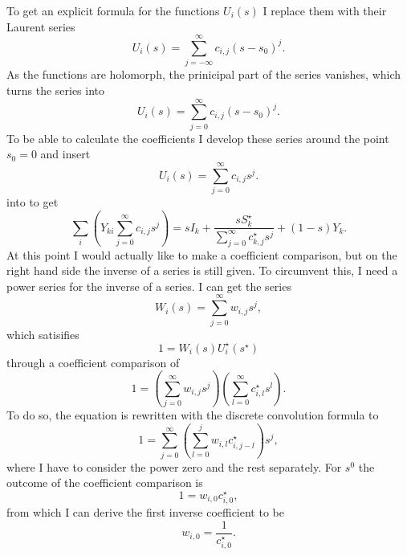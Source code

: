 To get an explicit formula for the functions $U_i(s)$ I replace them with their Laurent series
\begin{equation}
	U_i(s) = \sum_{j = -\infty}^\infty c_{i,j} (s - s_0)^j.
\end{equation}
As the functions are holomorph, the prinicipal part of the series vanishes, which turns the series into
\begin{equation}
	U_i(s) = \sum_{j = 0}^\infty c_{i,j} (s - s_0)^j.
\end{equation}
To be able to calculate the coefficients I develop these series around the point $s_0 = 0$ and insert
\begin{equation}
	U_i(s) = \sum_{j = 0}^\infty c_{i,j} s^j.
	\label{eq:helm_series}
\end{equation}
into  to get
\begin{equation}
		\sum_i \left( Y_{ki} \sum_{j = 0}^\infty c_{i,j} s^j \right) = s I_k + \frac{s S_k^\star}{\sum_{j = 0}^\infty c_{k,j}^\star s^j} + (1 - s) Y_k.
		\label{eq:helm_series_pq_bus}
\end{equation}
At this point I would actually like to make a coefficient comparison, but on the right hand side the inverse of a series is still given. To circumvent this, I need a power series for the inverse of a series. I can get the series
\begin{equation}
	W_i(s) = \sum_{j = 0}^\infty w_{i,j} s^j,
\end{equation}
which satisifies
\begin{equation}
	1 = W_i(s) U_i^\star(s^\star)
\end{equation}
through a coefficient comparison of
\begin{equation}
	1 = \left( \sum_{j = 0}^\infty w_{i,j} s^j \right) \left( \sum_{l = 0}^\infty c_{i,l}^\star s^l \right).
\end{equation}
To do so, the equation is rewritten with the discrete convolution formula to
\begin{equation}
	1 = \sum_{j = 0}^\infty \left( \sum_{l = 0}^j w_{i,l} c_{i,j - l}^\star \right) s^j,
\end{equation}
where I have to consider the power zero and the rest separately. For $s^0$ the outcome of the coefficient comparison is
\begin{equation}
	1 = w_{i,0} c_{i,0}^\star,
\end{equation}
from which I can derive the first inverse coefficient to be
\begin{equation}
	w_{i,0} = \frac{1}{c_{i,0}^\star}.
\end{equation}
